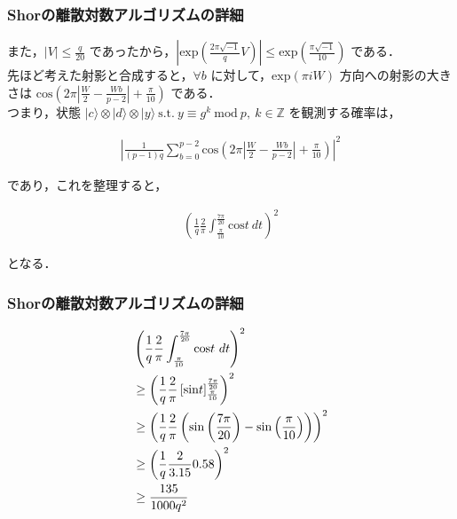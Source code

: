 \documentclass[dvipdfmx,12pt]{beamer}
\begin{document}
\begin{frame}
    
\frametitle{Shorの離散対数アルゴリズムの詳細}

また，$ | V | \leq \frac{q}{20} $ であったから，$ | \mathrm{exp} ( \frac{2 \pi \sqrt{-1}}{q} V ) | \leq \mathrm{exp} (\frac{\pi \sqrt{-1}}{10}) $ である．\\
先ほど考えた射影と合成すると，$ \forall b $ に対して，$ \mathrm{exp}(\pi i W) $ 方向への射影の大きさは $ \displaystyle \mathrm{cos} \left( 2 \pi \left| \frac{W}{2} - \frac{Wb}{p - 2} \right | + \frac{\pi}{10} \right) $ である．\\
つまり，状態 $ | c \rangle \otimes | d \rangle \otimes | y \rangle \ \mathrm{s.t.} \ y \equiv g^k \ \mathrm{mod} \ p, \ k \in \mathbb{Z} $ を観測する確率は， \vspace{-15pt}

\begin{align*}
    \displaystyle \left | \frac{1}{(p - 1)q} \sum_{b = 0}^{p - 2} \mathrm{cos} \left( 2 \pi \left| \frac{W}{2} - \frac{Wb}{p - 2} \right | + \frac{\pi}{10} \right) \right|^2
\end{align*}

であり，これを整理すると，\vspace{-15pt}

\begin{align*}
    \displaystyle \left( \frac{1}{q} \frac{2}{\pi} \int_{\frac{\pi}{10}}^{\frac{7 \pi}{20}} \mathrm{cos} t \ dt \right)^2
\end{align*}

となる．

\end{frame}


\begin{frame}
    
\frametitle{Shorの離散対数アルゴリズムの詳細}

\begin{align*}
    \displaystyle & \left( \frac{1}{q} \frac{2}{\pi} \int_{\frac{\pi}{10}}^{\frac{7 \pi}{20}} \mathrm{cos} t \ dt \right)^2 \\
    \displaystyle & \geq \left( \frac{1}{q} \frac{2}{\pi} \left[ \mathrm{sin} t \right]_{\frac{\pi}{10}}^{\frac{7 \pi}{20}} \right)^2 \\
    \displaystyle & \geq \left( \frac{1}{q} \frac{2}{\pi} \left( \mathrm{sin} \left( \frac{7 \pi}{20} \right) - \mathrm{sin} \left( \frac{\pi}{10} \right) \right) \right)^2 \\
    \displaystyle & \geq \left( \frac{1}{q} \frac{2}{3.15} 0.58 \right)^2 \\
    \displaystyle & \geq \frac{135}{1000q^2} \\    
\end{align*}

\end{frame}
\end{document}
